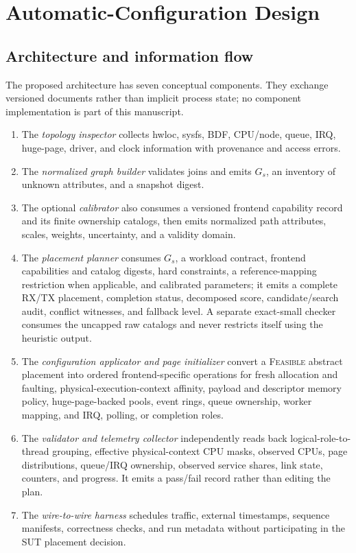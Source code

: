 \section{Automatic-Configuration Design}
\label{sec:design}

\subsection{Architecture and information flow}

The proposed \system{} architecture has seven conceptual components. They exchange versioned documents rather than implicit process state; no component implementation is part of this manuscript.

\begin{enumerate}[leftmargin=*,itemsep=3pt]
  \item The \emph{topology inspector} collects hwloc, sysfs, BDF, CPU/node, queue, IRQ, huge-page, driver, and clock information with provenance and access errors.
  \item The \emph{normalized graph builder} validates joins and emits $G_s$, an inventory of unknown attributes, and a snapshot digest.
  \item The optional \emph{calibrator} also consumes a versioned frontend capability record and its finite ownership catalogs, then emits normalized path attributes, scales, weights, uncertainty, and a validity domain.
  \item The \emph{placement planner} consumes $G_s$, a workload contract, frontend capabilities and catalog digests, hard constraints, a reference-mapping restriction when applicable, and calibrated parameters; it emits a complete RX/TX placement, completion status, decomposed score, candidate/search audit, conflict witnesses, and fallback level. A separate exact-small checker consumes the uncapped raw catalogs and never restricts itself using the heuristic output.
  \item The \emph{configuration applicator and page initializer} convert a \textsc{Feasible} abstract placement into ordered frontend-specific operations for fresh allocation and faulting, physical-execution-context affinity, payload and descriptor memory policy, huge-page-backed pools, event rings, queue ownership, worker mapping, and IRQ, polling, or completion roles.
  \item The \emph{validator and telemetry collector} independently reads back logical-role-to-thread grouping, effective physical-context CPU masks, observed CPUs, page distributions, queue/IRQ ownership, observed service shares, link state, counters, and progress. It emits a pass/fail record rather than editing the plan.
  \item The \emph{wire-to-wire harness} schedules traffic, external timestamps, sequence manifests, correctness checks, and run metadata without participating in the SUT placement decision.
\end{enumerate}

